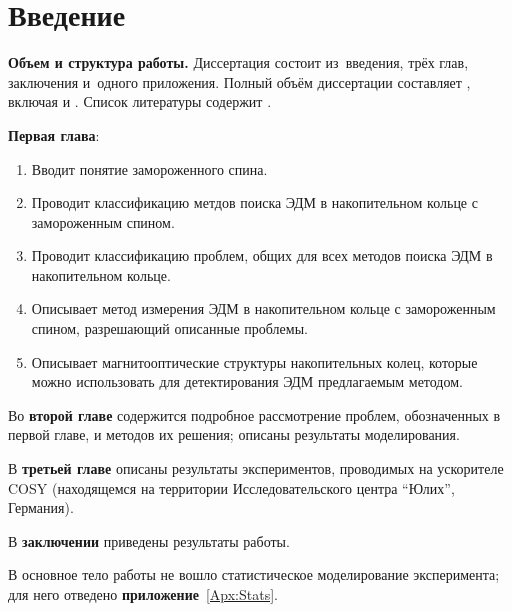 \chapter*{Введение}                         %

\newcommand{\actuality}{}
\newcommand{\progress}{}
\newcommand{\aim}{{\textbf\aimTXT}}
\newcommand{\tasks}{\textbf{\tasksTXT}}
\newcommand{\novelty}{\textbf{\noveltyTXT}}
\newcommand{\influence}{\textbf{\influenceTXT}}
\newcommand{\methods}{\textbf{\methodsTXT}}
\newcommand{\defpositions}{\textbf{\defpositionsTXT}}
\newcommand{\reliability}{\textbf{\reliabilityTXT}}
\newcommand{\probation}{\textbf{\probationTXT}}
\newcommand{\contribution}{\textbf{\contributionTXT}}
\newcommand{\publications}{\textbf{\publicationsTXT}}


\textbf{Объем и структура работы.} Диссертация состоит из~введения, трёх глав,
заключения и~одного приложения.
%
Полный объём диссертации составляет
, включая
 и
.   Список литературы содержит
.

\textbf{Первая глава}: 
\begin{enumerate}
	\item Вводит понятие замороженного спина.
	\item Проводит классификацию метдов поиска ЭДМ в накопительном кольце с замороженным спином.
	\item Проводит классификацию проблем, общих для всех методов поиска ЭДМ в накопительном кольце.
	\item Описывает метод измерения ЭДМ в накопительном кольце с замороженным спином, разрешающий описанные проблемы.
	\item Описывает магнитооптические структуры накопительных колец, которые можно использовать для детектирования ЭДМ предлагаемым методом.
\end{enumerate}

Во \textbf{второй главе} содержится подробное рассмотрение проблем, обозначенных в первой главе, и методов их решения; описаны результаты моделирования. 

В \textbf{третьей главе} описаны результаты экспериментов, проводимых на ускорителе COSY (находящемся на территории Исследовательского центра ``Юлих'', Германия).

В \textbf{заключении} приведены результаты работы.

В основное тело работы не вошло статистическое моделирование эксперимента; для него отведено \textbf{приложение}~\ref{Apx:Stats}.